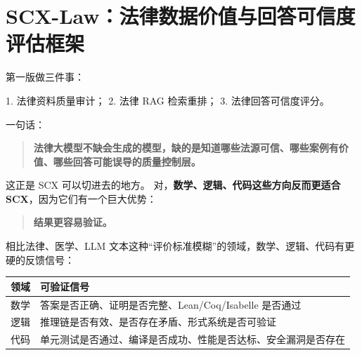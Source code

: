 \documentclass[
  12pt,
]{ctexart}
\newenvironment{Shaded}{}{}
\newcommand{\NormalTok}[1]{#1}
\begin{document}
\section{\texorpdfstring{\textbf{SCX-Law：法律数据价值与回答可信度评估框架}}{SCX-Law：法律数据价值与回答可信度评估框架}}\label{scx-lawux6cd5ux5f8bux6570ux636eux4ef7ux503cux4e0eux56deux7b54ux53efux4fe1ux5ea6ux8bc4ux4f30ux6846ux67b6}

第一版做三件事：

\begin{Shaded}
\begin{Highlighting}[]
\NormalTok{1. 法律资料质量审计；}
\NormalTok{2. 法律 RAG 检索重排；}
\NormalTok{3. 法律回答可信度评分。}
\end{Highlighting}
\end{Shaded}

一句话：

\begin{quote}
\textbf{法律大模型不缺会生成的模型，缺的是知道哪些法源可信、哪些案例有价值、哪些回答可能误导的质量控制层。}
\end{quote}

这正是 SCX 可以切进去的地方。
对，\textbf{数学、逻辑、代码这些方向反而更适合
SCX}，因为它们有一个巨大优势：

\begin{quote}
\textbf{结果更容易验证。}
\end{quote}

相比法律、医学、LLM
文本这种``评价标准模糊''的领域，数学、逻辑、代码有更硬的反馈信号：

\begin{longtable}[]{@{}
  >{\raggedright\arraybackslash}p{}
  >{\raggedright\arraybackslash}p{}@{}}
\toprule\noalign{}
\begin{minipage}[b]{\linewidth}\raggedright
领域
\end{minipage} & \begin{minipage}[b]{\linewidth}\raggedright
可验证信号
\end{minipage} \\
\midrule\noalign{}
\endhead
\bottomrule\noalign{}
\endlastfoot
数学 & 答案是否正确、证明是否完整、Lean/Coq/Isabelle 是否通过 \\
逻辑 & 推理链是否有效、是否存在矛盾、形式系统是否可验证 \\
代码 & 单元测试是否通过、编译是否成功、性能是否达标、安全漏洞是否存在 \\
\end{longtable}
\end{document}
